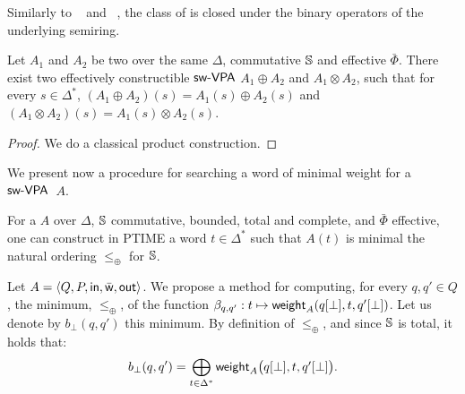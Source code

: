 \medskip\noindent
Similarly to \VPA~\cite{AlurMadhusudan09nested}
and \SVPA~\cite{dAntonyAlur14SVPDA},
the class of \SWVPA is closed under the binary operators of the underlying semiring.
%
\begin{proposition}\label{prop:SWVPA-product}
Let $A_1$ and $A_2$ be two \SWVPA
over the same $\Delta$, commutative $\mathbb{S}$ and effective $\bar\Phi$.
There exist two effectively constructible $\textsf{sw-VPA}$
$A_1 \oplus A_2$ and $A_1 \otimes A_2$,
such that for every $s \in \Delta^*$,
$(A_1 \oplus A_2)(s) = A_1(s) \oplus A_2(s)$ and
$(A_1 \otimes A_2)(s) = A_1(s) \otimes A_2(s)$.
\end{proposition}
%
\begin{proof}
We do a classical product construction. %

\end{proof}
\noindent
We present now a procedure for searching a word of minimal weight for a~$\textsf{sw-VPA}$~$A$.
%
\begin{proposition}\label{th:best-search}
For a \SWVPA $A$
over $\Delta$,
$\mathbb{S}$ commutative, bounded, total and complete, %
and $\bar\Phi$ effective, %
one can construct in PTIME a word $t \in \Delta^*$
such that $A(t)$ is minimal \wrt the natural ordering $\leq_\oplus$ for $\mathbb{S}$.
\end{proposition}
%
Let $A = \< Q, P, \init, \bar\wei, \final >$.
%
We propose a method for %
computing,
for every $q, q' \in Q$,
the minimum, \wrt $\leq_\oplus$, of the function
$\beta_{q, q'} : t \mapsto \mathsf{weight}_A(q[{\bot}], t, q'[{\bot}])$.
Let us denote by $b_\bot(q, q')$ this minimum.
%
By definition of $\leq_\oplus$, and since $\mathbb{S}$ is total,
it holds that:
%
\begin{equation}\label{eq:bbot}
  b_\bot(q, q') = \bigoplus_{t\in \Delta^*}
  \textstyle
  \mathsf{weight}_A\bigl(q[{\bot}], t, q'[{\bot}]\bigr).
\end{equation}
